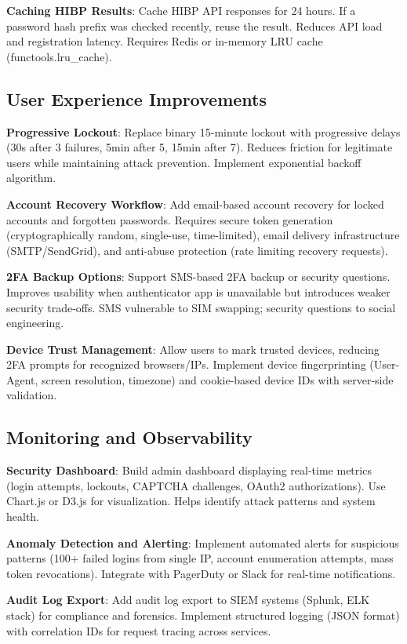 \documentclass[12pt,a4paper]{article}
\begin{document}
\textbf{Caching HIBP Results}: Cache HIBP API responses for 24 hours. If a password hash prefix was checked recently, reuse the result. Reduces API load and registration latency. Requires Redis or in-memory LRU cache (functools.lru\_cache).

\subsection{User Experience Improvements}

\textbf{Progressive Lockout}: Replace binary 15-minute lockout with progressive delays (30s after 3 failures, 5min after 5, 15min after 7). Reduces friction for legitimate users while maintaining attack prevention. Implement exponential backoff algorithm.

\textbf{Account Recovery Workflow}: Add email-based account recovery for locked accounts and forgotten passwords. Requires secure token generation (cryptographically random, single-use, time-limited), email delivery infrastructure (SMTP/SendGrid), and anti-abuse protection (rate limiting recovery requests).

\textbf{2FA Backup Options}: Support SMS-based 2FA backup or security questions. Improves usability when authenticator app is unavailable but introduces weaker security trade-offs. SMS vulnerable to SIM swapping; security questions to social engineering.

\textbf{Device Trust Management}: Allow users to mark trusted devices, reducing 2FA prompts for recognized browsers/IPs. Implement device fingerprinting (User-Agent, screen resolution, timezone) and cookie-based device IDs with server-side validation.

\subsection{Monitoring and Observability}

\textbf{Security Dashboard}: Build admin dashboard displaying real-time metrics (login attempts, lockouts, CAPTCHA challenges, OAuth2 authorizations). Use Chart.js or D3.js for visualization. Helps identify attack patterns and system health.

\textbf{Anomaly Detection and Alerting}: Implement automated alerts for suspicious patterns (100+ failed logins from single IP, account enumeration attempts, mass token revocations). Integrate with PagerDuty or Slack for real-time notifications.

\textbf{Audit Log Export}: Add audit log export to SIEM systems (Splunk, ELK stack) for compliance and forensics. Implement structured logging (JSON format) with correlation IDs for request tracing across services.
\end{document}
